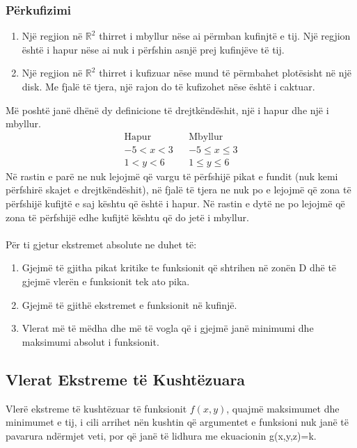 \documentclass[a4paper]{article}
\begin{document}
\subsubsection{Përkufizimi}
\begin{enumerate}
	\item Një regjion në $\mathbb{R}^2$ thirret i mbyllur nëse ai përmban  kufinjtë e tij. Një regjion është i hapur nëse ai nuk i përfshin asnjë prej kufinjëve të tij.
	\item Një regjion në $\mathbb{R}^2$ thirret i kufizuar nëse mund të përmbahet plotësisht në një disk. Me fjalë të tjera, një rajon do të kufizohet nëse është i caktuar.
\end{enumerate}
Më poshtë janë dhënë dy definicione të drejtkëndëshit, një i hapur dhe një i mbyllur.
\begin{align*}
	\text{Hapur} &  & \text{Mbyllur}   \\
	-5 < x < 3   &  & -5 \leq x \leq 3 \\
	1 < y < 6    &  & 1 \leq y \leq 6
\end{align*}
Në rastin e parë ne nuk lejojmë që vargu të përfshijë pikat e fundit (nuk kemi përfshirë skajet e drejtkëndëshit), në fjalë të tjera ne nuk po e lejojmë që zona të përfshijë kufijtë e saj kështu që është i hapur. Në rastin e dytë ne po lejojmë që zona të përfshijë edhe kufijtë kështu që do jetë i mbyllur.
\\\\
Për ti gjetur ekstremet absolute ne duhet të:
\begin{enumerate}
	\item Gjejmë të gjitha pikat kritike te funksionit që shtrihen në zonën D dhë të gjejmë vlerën e funksionit tek ato pika.
	\item Gjejmë të gjithë ekstremet e funksionit në kufinjë.
	\item Vlerat më të mëdha dhe më të vogla që i gjejmë janë minimumi dhe maksimumi absolut i funksionit.
\end{enumerate}

\subsection{Vlerat Ekstreme të Kushtëzuara}
Vlerë ekstreme të kushtëzuar të funksionit $f(x,y)$, quajmë maksimumet dhe minimumet e tij, i cili arrihet nën kushtin që argumentet e funksioni nuk janë të pavarura ndërmjet veti, por që janë të lidhura me ekuacionin g(x,y,z)=k.
\end{document}
